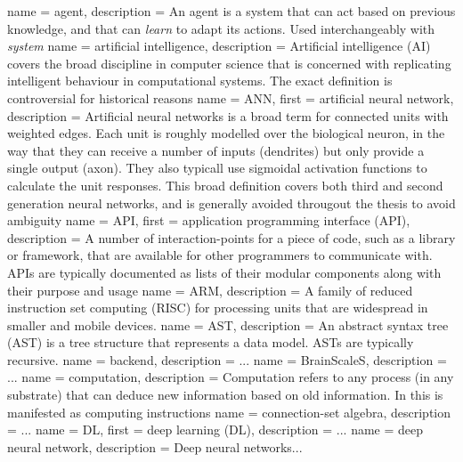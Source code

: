 {
  name = agent,
  description = {An agent is a system that can act based on previous knowledge,
		 and that can \textit{learn} to adapt its actions.
	         Used interchangeably with \textit{system}}
}
 {
    name = artificial intelligence,
    description = {Artificial intelligence (AI) covers the broad discipline in computer science
that is concerned with replicating intelligent behaviour in computational systems. The exact
definition is controversial for historical reasons \autocite{Nilsson2009}}
}
 {
  name = ANN,
  first = {artificial neural network},
  description = {
    Artificial neural networks is a broad term for connected units with 
    weighted edges.
    Each unit is roughly modelled over the biological neuron, in the way 
    that they can receive a number of inputs (dendrites) 
    but only provide a single output (axon).
    They also typicall use sigmoidal activation functions to calculate the 
    unit responses.
    This broad definition covers both third and second generation neural
    networks, and is generally avoided througout the thesis to avoid 
    ambiguity}
}
 {
  name = API,
  first = {application programming interface (API)},
  description = {A number of interaction-points for a piece of code,
		 such as a library or framework, that are available for
		 other programmers to communicate with. APIs are typically
		 documented as lists of their modular components along
		 with their purpose and usage}
}
 {
  name = {ARM},
  description = {A family of reduced instruction set computing (RISC) for 
                 processing units that are widespread in smaller and mobile
		 devices.}
}
 {
  name = {AST},
  description = {An abstract syntax tree (AST) is a tree structure that 
                 represents a data model. ASTs are typically recursive.}
}
 {
  name = backend,
  description = {...}
}
 {
  name = BrainScaleS,
  description = {...}
}
 {
   name = computation,
   description = {Computation refers to any process (in any
substrate) that can deduce new information based on old information. In
this is manifested as computing instructions}
}
 {
  name = {connection-set algebra},
  description = {...}
}
 {
  name = {DL},
  first = {deep learning (DL)},
  description = {...}
}
 {
  name = {deep neural network},
  description = {Deep neural networks...}
}

